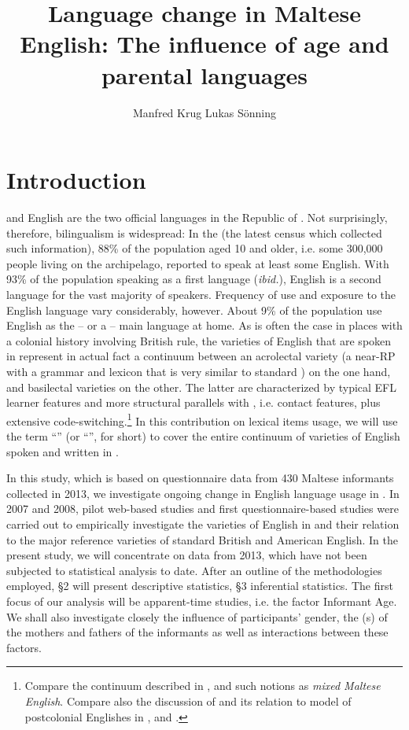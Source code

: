 \documentclass[output=paper]{langsci/langscibook}
\author{Manfred Krug\lastand
Lukas Sönning\affiliation{University of Bamberg}}
\title{Language change in Maltese English: The influence of age and parental languages}
\begin{document}
\section{Introduction}

 and English are the two official languages in the Republic of . Not surprisingly, therefore, bilingualism is widespread: In the \citet{census} (the latest census which collected such information), 88\% of the population aged 10 and older, i.e. some 300,000 people living on the archipelago, reported to speak at least some English. With 93\% of the population speaking  as a first language (\textit{ibid.}), English is a second language for the vast majority of speakers. Frequency of use and exposure to the English language vary considerably, however. About 9\% of the population use English as the – or a – main language at home. As is often the case in places with a colonial history involving British rule, the varieties of English that are spoken in  represent in actual fact a continuum between an acrolectal variety (a near-RP  with a grammar and lexicon that is very similar to standard ) on the one hand, and basilectal varieties on the other. The latter are characterized by typical EFL learner features and more structural parallels with , i.e. contact features, plus extensive code-switching.\footnote{Compare the continuum described in \citet{Vella1994}, \citet{Bonnici2010} and such notions as \textit{mixed Maltese English}. Compare also the discussion of  and its relation to  model of postcolonial Englishes in \citet{Thusatetal2009}, \citet{Bonnicietal2012} and \citet{Grech2015}.} In this contribution on lexical items usage, we will use the term “” (or “”, for short) to cover the entire continuum of varieties of English spoken and written in .

In this study, which is based on questionnaire data from 430 Maltese informants collected in 2013, we investigate ongoing change in English language usage in . In 2007 and 2008, pilot web-based studies and first questionnaire-based studies were carried out to empirically investigate the varieties of English in  and their relation to the major reference varieties of standard British and American English. In the present study, we will concentrate on data from 2013, which have not been subjected to statistical analysis to date. After an outline of the methodologies employed, §2 will present descriptive statistics, §3 inferential statistics. The first focus of our analysis will be apparent-time studies, i.e. the factor Informant Age. We shall also investigate closely the influence of participants’ gender, the (s) of the mothers and fathers of the informants as well as interactions between these factors.
\end{document}
